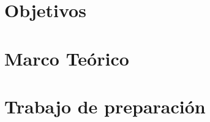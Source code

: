 \documentclass{article}
\begin{document}

\tableofcontents
\newpage

\section{Objetivos}



\section{Marco Teórico}



\section{Trabajo de preparación}



\FloatBarrier

\end{document}
